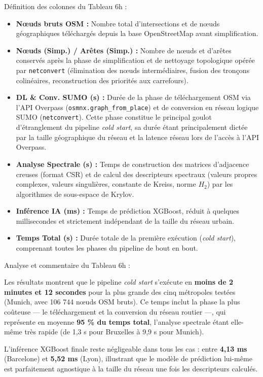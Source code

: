 \documentclass[10pt, a4paper]{article}
\providecommand{\tightlist}{}
\begin{document}
Définition des colonnes du Tableau 6h :

\begin{itemize}
\tightlist
\item
  \textbf{Nœuds bruts OSM :} Nombre total d'intersections et de nœuds
  géographiques téléchargés depuis la base OpenStreetMap avant
  simplification.
\item
  \textbf{Nœuds (Simp.) / Arêtes (Simp.) :} Nombre de nœuds et d'arêtes
  conservés après la phase de simplification et de nettoyage topologique
  opérée par \texttt{netconvert} (élimination des nœuds intermédiaires,
  fusion des tronçons colinéaires, reconstruction des priorités aux
  carrefours).
\item
  \textbf{DL \& Conv. SUMO (s) :} Durée de la phase de téléchargement
  OSM via l'API Overpass (\texttt{osmnx.graph\_from\_place}) et de
  conversion en réseau logique SUMO (\texttt{netconvert}). Cette phase
  constitue le principal goulot d'étranglement du pipeline \emph{cold
  start}, sa durée étant principalement dictée par la taille
  géographique du réseau et la latence réseau lors de l'accès à l'API
  Overpass.
\item
  \textbf{Analyse Spectrale (s) :} Temps de construction des matrices
  d'adjacence creuses (format CSR) et de calcul des descripteurs
  spectraux (valeurs propres complexes, valeurs singulières, constante
  de Kreiss, norme \(H_2\)) par les algorithmes de sous-espace de
  Krylov.
\item
  \textbf{Inférence IA (ms) :} Temps de prédiction XGBoost, réduit à
  quelques millisecondes et strictement indépendant de la taille du
  réseau urbain.
\item
  \textbf{Temps Total (s) :} Durée totale de la première exécution
  (\emph{cold start}), comprenant toutes les phases du pipeline de bout
  en bout.
\end{itemize}

Analyse et commentaire du Tableau 6h :

Les résultats montrent que le pipeline \emph{cold start} s'exécute en
\textbf{moins de 2 minutes et 12 secondes} pour la plus grande des cinq
métropoles testées (Munich, avec 106 744 nœuds OSM bruts). Ce temps
inclut la phase la plus coûteuse --- le téléchargement et la conversion
du réseau routier ---, qui représente en moyenne \textbf{95 \% du temps
total}, l'analyse spectrale étant elle-même très rapide (de 1,3 s pour
Bruxelles à 9,9 s pour Munich).

L'inférence XGBoost finale reste négligeable dans tous les cas : entre
\textbf{4,13 ms} (Barcelone) et \textbf{5,52 ms} (Lyon), illustrant que
le modèle de prédiction lui-même est parfaitement agnostique à la taille
du réseau une fois les descripteurs calculés.
\end{document}
